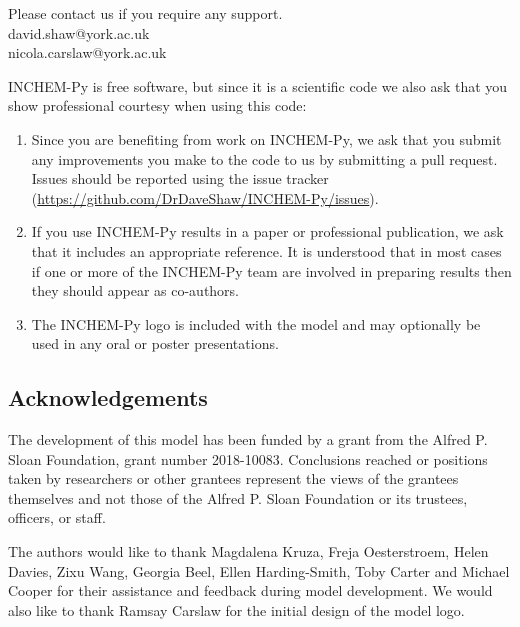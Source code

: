 \documentclass[a4paper]{refart}
\begin{document}
Please contact us if you require any support.\\
david.shaw@york.ac.uk\\
nicola.carslaw@york.ac.uk

INCHEM-Py is free software, but since it is a scientific code we also ask that you show professional courtesy when using this code:
\begin{enumerate}
    \item Since you are benefiting from work on INCHEM-Py, we ask that you submit any improvements you make to the code to us by submitting a pull request. Issues should be reported using the issue tracker (\url{https://github.com/DrDaveShaw/INCHEM-Py/issues}).
    \item If you use INCHEM-Py results in a paper or professional publication, we ask that it includes an appropriate reference. It is understood that in most cases if one or more of the INCHEM-Py team are involved in preparing results then they should appear as co-authors.
    \item The INCHEM-Py logo is included with the model and may optionally be used in any oral or poster presentations.
\end{enumerate}

\subsection{Acknowledgements}
The development of this model has been funded by a grant from the Alfred P. Sloan Foundation, grant number 2018-10083. Conclusions reached or positions taken by researchers or other grantees represent the views of the grantees themselves and not those of the Alfred P. Sloan Foundation or its trustees, officers, or staff.

The authors would like to thank Magdalena Kruza, Freja Oesterstroem, Helen Davies, Zixu Wang, Georgia Beel, Ellen Harding-Smith, Toby Carter and Michael Cooper for their assistance and feedback during model development. We would also like to thank Ramsay Carslaw for the initial design of the model logo.


\printindex

\printbibliography

\newpage
\appendix
\end{document}
